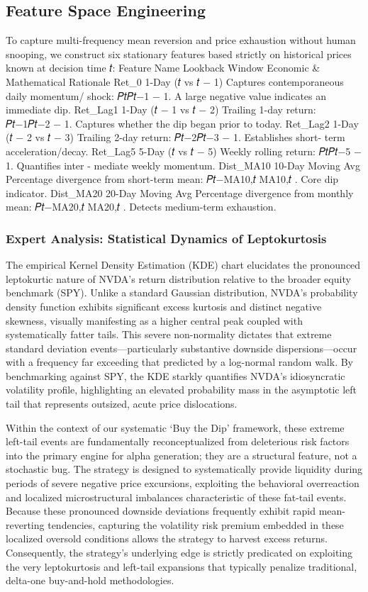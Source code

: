 \documentclass[12pt, a4paper]{article}
\begin{document}
\subsection{Feature Space Engineering}
To capture multi-frequency mean reversion and price exhaustion without human snooping, we construct 
six stationary features based strictly on historical prices known at decision time 𝑡:
Feature Name Lookback Window Economic \& Mathematical Rationale
Ret\_0 1-Day (𝑡 vs 𝑡 − 1) Captures contemporaneous daily momentum/
shock: 𝑃𝑡𝑃{𝑡−1} − 1. A large negative value indicates 
an immediate dip.
Ret\_Lag1 1-Day (𝑡 − 1 vs 𝑡 − 2) Trailing 1-day return: 𝑃{𝑡−1}𝑃{𝑡−2} − 1. Captures whether 
the dip began prior to today.
Ret\_Lag2 1-Day (𝑡 − 2 vs 𝑡 − 3) Trailing 2-day return: 𝑃{𝑡−2}𝑃{𝑡−3} − 1. Establishes short-
term acceleration/decay.
Ret\_Lag5 5-Day (𝑡 vs 𝑡 − 5) Weekly rolling return: 𝑃𝑡𝑃{𝑡−5} − 1. Quantifies inter -
mediate weekly momentum.
Dist\_MA10 10-Day Moving Avg Percentage divergence from short-term mean: 
𝑃𝑡−MA{10,𝑡}
MA{10,𝑡} . Core dip indicator.
Dist\_MA20 20-Day Moving Avg Percentage divergence from monthly mean: 
𝑃𝑡−MA{20,𝑡}
MA{20,𝑡} . Detects medium-term exhaustion.


\subsubsection*{Expert Analysis: Statistical Dynamics of Leptokurtosis}
The empirical Kernel Density Estimation (KDE) chart elucidates the pronounced leptokurtic nature of NVDA's return distribution relative to the broader equity benchmark (SPY). Unlike a standard Gaussian distribution, NVDA's probability density function exhibits significant excess kurtosis and distinct negative skewness, visually manifesting as a higher central peak coupled with systematically fatter tails. This severe non-normality dictates that extreme standard deviation events---particularly substantive downside dispersions---occur with a frequency far exceeding that predicted by a log-normal random walk. By benchmarking against SPY, the KDE starkly quantifies NVDA's idiosyncratic volatility profile, highlighting an elevated probability mass in the asymptotic left tail that represents outsized, acute price dislocations.

Within the context of our systematic `Buy the Dip' framework, these extreme left-tail events are fundamentally reconceptualized from deleterious risk factors into the primary engine for alpha generation; they are a structural feature, not a stochastic bug. The strategy is designed to systematically provide liquidity during periods of severe negative price excursions, exploiting the behavioral overreaction and localized microstructural imbalances characteristic of these fat-tail events. Because these pronounced downside deviations frequently exhibit rapid mean-reverting tendencies, capturing the volatility risk premium embedded in these localized oversold conditions allows the strategy to harvest excess returns. Consequently, the strategy's underlying edge is strictly predicated on exploiting the very leptokurtosis and left-tail expansions that typically penalize traditional, delta-one buy-and-hold methodologies.
\end{document}
